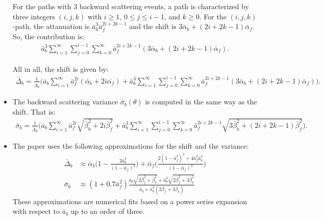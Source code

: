 \documentclass[10pt]{article}
\begin{document}
\begin{itemize}
    For the paths with $3$ backward scattering events, a path is characterized by three integers $(i,j,k)$ with $i \geq 1$, $0 \leq j \leq i-1$, and $k \geq 0$.  For the $(i,j,k)$-path, the attanuation is $\bar{a}_b^3 \bar{a}_f^{2i + 2k - 1}$ and the shift is $3 \bar{\alpha}_b + (2i+2k-1) \bar{\alpha}_f$.  So, the contribution is:
    \begin{align*}
      \bar{a}_b^3 \sum_{i=1}^\infty \sum_{j=0}^{i-1} \sum_{k=0}^\infty \bar{a}_f^{2i + 2k - 1} (3 \bar{\alpha}_b + (2i+2k-1) \bar{\alpha}_f).
    \end{align*}

    All in all, the shift is given by:
    \begin{align*}
      \bar{\Delta}_b = \frac{1}{\bar{A}_b} \bigg( \bar{a}_b \sum_{i=1}^\infty \bar{a}_f^{2i}( \bar{\alpha}_b + 2i\bar{\alpha_f}) + \bar{a}_b^3 \sum_{i=1}^\infty \sum_{j=0}^{i-1} \sum_{k=0}^\infty \bar{a}_f^{2i + 2k - 1} (3 \bar{\alpha}_b + (2i+2k-1) \bar{\alpha}_f) \bigg).
    \end{align*}

    \item The backward scattering variance $\bar{\sigma}_b(\theta)$ is computed in the same way as the shift.  That is:
    \begin{align*}
       \bar{\sigma}_b = \frac{1}{\bar{A}_b} \bigg( 
       \bar{a}_b \sum_{i=1}^\infty \bar{a}_f^{2i} \sqrt{\bar{\beta}_b^2 + 2i \bar{\beta}_f^2} + 
       \bar{a}_b^3 \sum_{i=1}^\infty \sum_{j=0}^{i-1} \sum_{k=0}^\infty \bar{a}_f^{2i + 2k - 1} \sqrt{3 \bar{\beta}_b^2 + (2i+2k-1) \bar{\beta}_f^2} \bigg).
    \end{align*} 

    \item The paper uses the following approximations for the shift and the variance:
    \begin{align*}
      \bar{\Delta}_b 
      &\approx \bar{\alpha}_b \bigg( 1 - \frac{2\bar{a}_b^2}{(1-\bar{\alpha}_f)^2} \bigg)
      + \bar{\alpha}_f \bigg( \frac{2(1-\bar{a}_f^2)^2 + 4\bar{a}_f^2 \bar{a}_b^2}{(1-\bar{\alpha}_f)^3} \bigg)\\
      \bar{\sigma}_b
      &\approx (1 + 0.7 \bar{a}_f^2) \frac{\bar{a}_b \sqrt{2 \bar{\beta}_f^2 + \bar{\beta}_b^2} + \bar{a}_b^3 \sqrt{2\bar{\beta}_f^2 + 3\bar{\beta}_b^2} }{\bar{a}_b + \bar{a}_b^3(2\bar{\beta}_f + 3\bar{\beta}_b)}
    \end{align*} 
    These approximations are numerical fits based on a power series expansion with respect to $\bar{a}_b$ up to an order of three.
  \end{itemize}  
\end{document}
